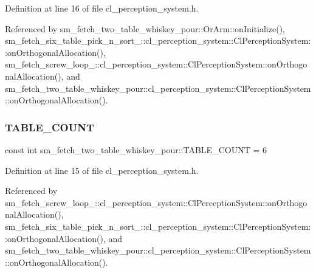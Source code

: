 Definition at line 16 of file cl\+\_\+perception\+\_\+system.\+h.



Referenced by sm\+\_\+fetch\+\_\+two\+\_\+table\+\_\+whiskey\+\_\+pour\+::\+Or\+Arm\+::on\+Initialize(), sm\+\_\+fetch\+\_\+six\+\_\+table\+\_\+pick\+\_\+n\+\_\+sort\+\_\+::cl\+\_\+perception\+\_\+system\+::\+Cl\+Perception\+System\+::on\+Orthogonal\+Allocation(), sm\+\_\+fetch\+\_\+screw\+\_\+loop\+\_\+::cl\+\_\+perception\+\_\+system\+::\+Cl\+Perception\+System\+::on\+Orthogonal\+Allocation(), and sm\+\_\+fetch\+\_\+two\+\_\+table\+\_\+whiskey\+\_\+pour\+::cl\+\_\+perception\+\_\+system\+::\+Cl\+Perception\+System\+::on\+Orthogonal\+Allocation().

\mbox{\label{namespacesm__fetch__two__table__whiskey__pour_a17b0c4eed9dc45b1cdf81aeb8cab3fda}} 
\subsubsection{\texorpdfstring{T\+A\+B\+L\+E\+\_\+\+C\+O\+U\+NT}{TABLE\_COUNT}}
{\footnotesize\ttfamily const int sm\+\_\+fetch\+\_\+two\+\_\+table\+\_\+whiskey\+\_\+pour\+::\+T\+A\+B\+L\+E\+\_\+\+C\+O\+U\+NT = 6}



Definition at line 15 of file cl\+\_\+perception\+\_\+system.\+h.



Referenced by sm\+\_\+fetch\+\_\+screw\+\_\+loop\+\_\+::cl\+\_\+perception\+\_\+system\+::\+Cl\+Perception\+System\+::on\+Orthogonal\+Allocation(), sm\+\_\+fetch\+\_\+six\+\_\+table\+\_\+pick\+\_\+n\+\_\+sort\+\_\+::cl\+\_\+perception\+\_\+system\+::\+Cl\+Perception\+System\+::on\+Orthogonal\+Allocation(), and sm\+\_\+fetch\+\_\+two\+\_\+table\+\_\+whiskey\+\_\+pour\+::cl\+\_\+perception\+\_\+system\+::\+Cl\+Perception\+System\+::on\+Orthogonal\+Allocation().

